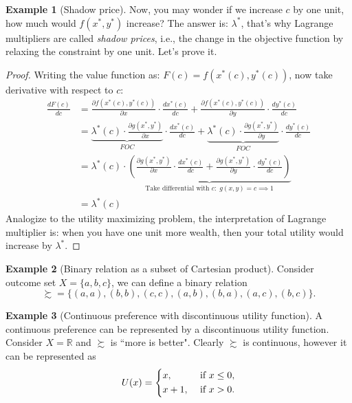 \documentclass[12pt, a4paper]{article}
\theoremstyle{definition}
\newtheorem{example}{Example}
\begin{document}
\begin{example}[Shadow price]
Now, you may wonder if we increase $c$ by one unit, how much would $f(x^{*},y^{*})$ increase? The answer is: $\lambda^{*}$, that's why Lagrange multipliers are called \emph{shadow prices}, i.e., the change in the objective function by relaxing the constraint by one unit. Let's prove it.
\begin{proof}
Writing the value function as: $F(c) = f(x^{*}(c),y^{*}(c))$, now take derivative with respect to $c$:
\begin{align*}
\frac{dF(c)}{dc} &= \frac{\partial f(x^{*}(c),y^{*}(c))}{\partial x}\cdot \frac{dx^{*}(c)}{dc}+\frac{\partial f(x^{*}(c),y^{*}(c))}{\partial y}\cdot \frac{dy^{*}(c)}{dc}\\
&=\underbrace{\lambda^{*}(c)\cdot \frac{\partial g(x^{*},y^{*})}{\partial x}}_{FOC}\cdot \frac{dx^{*}(c)}{dc}+\underbrace{\lambda^{*}(c)\cdot\frac{\partial g(x^{*},y^{*})}{\partial y}}_{FOC}\cdot \frac{dy^{*}(c)}{dc}\\
&=\lambda^{*}(c)\cdot\underbrace{(\frac{\partial g(x^{*},y^{*})}{\partial x}\cdot \frac{dx^{*}(c)}{dc}+\frac{\partial g(x^{*},y^{*})}{\partial y}\cdot \frac{dy^{*}(c)}{dc})}_{\textrm{Take differential with }c:\;g(x,y)=c\implies 1}\\
&=\lambda^{*}(c)
\end{align*}
Analogize to the utility maximizing problem, the interpretation of Lagrange multiplier is: when you have one unit more wealth, then your total utility would increase by $\lambda^{*}$.
\end{proof}
\end{example}

\begin{example}[Binary relation as a subset of Cartesian product]
Consider outcome set $X=\{a,b,c\}$, we can define a binary relation 
\[
\succsim = \{(a,a),(b,b),(c,c),(a,b),(b,a),(a,c),(b,c)\}.
\] 
\end{example}

\begin{example}[Continuous preference with discontinuous utility function]
A continuous preference can be represented by a discontinuous utility function. Consider $X=\mathbb{R}$ and $\succsim$ is ``more is better". Clearly $\succsim$ is continuous, however it can be represented as
\[
U(x)=\begin{dcases}
x, &\text{ if }x\leq 0,\\
x+1, &\text{ if }x>0. 
\end{dcases}
\]
\end{example}
\end{document}
